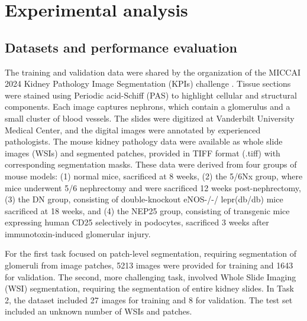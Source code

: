 \section{Experimental analysis}
\subsection{Datasets and performance evaluation}
The training and validation data were shared by the organization of the MICCAI 2024 Kidney Pathology Image Segmentation (KPIs) challenge \cite{KPIs2024}. 
Tissue sections were stained using Periodic acid-Schiff (PAS) to highlight cellular and structural components. Each image captures nephrons, which contain a glomerulus and a small cluster of blood vessels. The slides were digitized at Vanderbilt University Medical Center, and the digital images were annotated by experienced pathologists.
The mouse kidney pathology data were available as whole slide images (WSIs) and segmented patches, provided in TIFF format (.tiff) with corresponding segmentation masks. 
These data were derived from four groups of mouse models: (1) normal mice, sacrificed at 8 weeks, (2) the 5/6Nx group, where mice underwent 5/6 nephrectomy and were sacrificed 12 weeks post-nephrectomy, (3) the DN group, consisting of double-knockout eNOS-/-/ lepr(db/db) mice sacrificed at 18 weeks, and (4) the NEP25 group, consisting of transgenic mice expressing human CD25 selectively in podocytes, sacrificed 3 weeks after immunotoxin-induced glomerular injury.

For the first task focused on patch-level segmentation, requiring segmentation of glomeruli from image patches, 5213 images were provided for training and 1643 for validation. 
The second, more challenging task, involved Whole Slide Imaging (WSI) segmentation, requiring the segmentation of entire kidney slides.
In Task 2, the dataset included 27 images for training and 8 for validation.
The test set included an unknown number of WSIs and patches.



